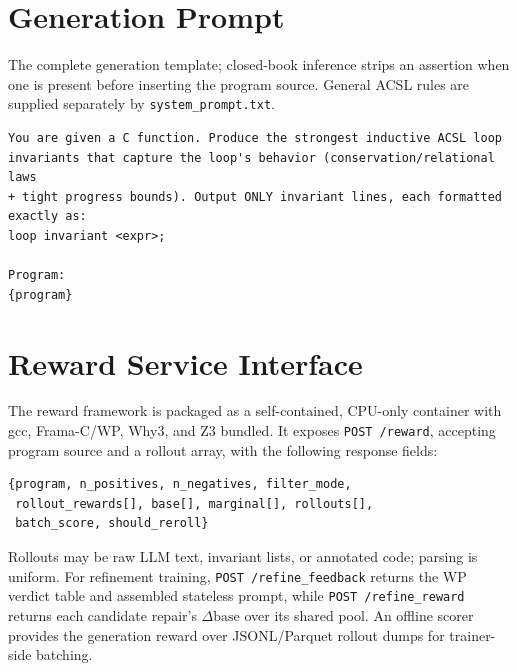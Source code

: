 \section{Generation Prompt}
\label{app:prompt}

The complete generation template; closed-book inference strips an assertion when one is present before inserting the program source.  General ACSL rules are supplied separately by \texttt{system\_prompt.txt}.

\begin{promptbox}
\begin{lstlisting}[style=promptstyle]
You are given a C function. Produce the strongest inductive ACSL loop
invariants that capture the loop's behavior (conservation/relational laws
+ tight progress bounds). Output ONLY invariant lines, each formatted
exactly as:
loop invariant <expr>;

Program:
{program}
\end{lstlisting}
\end{promptbox}

\section{Reward Service Interface}
\label{app:service}

The reward framework is packaged as a self-contained, CPU-only container with gcc, Frama-C/WP, Why3, and Z3 bundled.  It exposes \texttt{POST /reward}, accepting program source and a rollout array, with the following response fields:
\begin{lstlisting}[style=promptstyle]
{program, n_positives, n_negatives, filter_mode,
 rollout_rewards[], base[], marginal[], rollouts[],
 batch_score, should_reroll}
\end{lstlisting}
Rollouts may be raw LLM text, invariant lists, or annotated code; parsing is uniform.
For refinement training, \texttt{POST /refine\_feedback} returns the WP verdict table and assembled stateless prompt, while \texttt{POST /refine\_reward} returns each candidate repair's $\Delta\mathrm{base}$ over its shared pool.  An offline scorer provides the generation reward over JSONL/Parquet rollout dumps for trainer-side batching.
